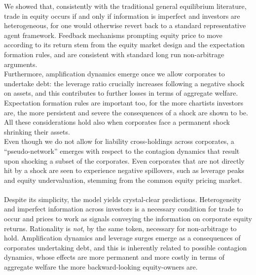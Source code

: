 \documentclass[11pt]{article}
\begin{document}
We showed that, consistently with the traditional general equilibrium literature, trade in equity occurs if and only if information is imperfect and investors are heterogeneous, for one would otherwise revert back to a standard representative agent framework. Feedback mechanisms prompting equity price to move according to its return stem from the equity market design and the expectation formation rules, and are consistent with standard  long run non-arbitrage arguments.\\ Furthermore, amplification dynamics emerge once we allow corporates to undertake debt: the leverage ratio crucially increases following a negative shock on assets, and this contributes to further losses in terms of aggregate welfare. Expectation formation rules are important too, for the more chartists investors are, the more persistent and severe the consequences of a shock are shown to be. All these considerations hold also when corporates face a permanent shock shrinking their assets.\\
Even though we do not allow for liability cross-holdings across corporates, a ``pseudo-network'' emerges with respect to the contagion dynamics that result upon shocking a subset of the corporates. Even corporates that are not directly hit by a shock are seen to experience negative spillovers, such as leverage peaks and equity undervaluation, stemming from the common equity pricing market.\\\\
Despite its simplicity, the model yields crystal-clear predictions. Heterogeneity and imperfect information across investors is a necessary condition for trade to occur and prices to work as signals conveying the information on corporate equity returns. Rationality is \emph{not}, by the same token, necessary for non-arbitrage to hold. Amplification dynamics and leverage surges emerge as a consequences of corporates undertaking debt, and this is inherently related to possible contagion dynamics, whose effects are more permanent and more costly in terms of aggregate welfare the more backward-looking equity-owners are.
\end{document}
